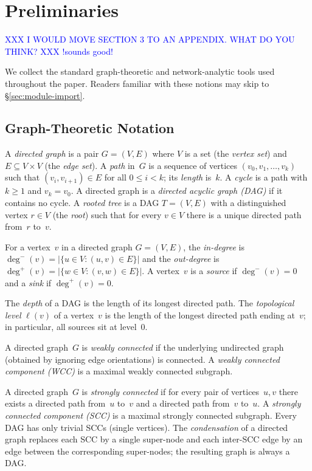 \section{Preliminaries}
\label{sec:preliminaries}

\textcolor{blue}{XXX I WOULD MOVE SECTION 3 TO AN APPENDIX. WHAT DO YOU THINK? XXX !sounds good!}


We collect the standard graph-theoretic and network-analytic tools used throughout the paper. Readers familiar with these notions may skip to \S\ref{sec:module-import}.

\subsection{Graph-Theoretic Notation}
\label{sec:prelim-graph}

A \emph{directed graph} is a pair $G = (V, E)$ where $V$ is a set (the \emph{vertex set}) and $E \subseteq V \times V$ (the \emph{edge set}). A \emph{path} in~$G$ is a sequence of vertices $(v_0, v_1, \ldots, v_k)$ such that $(v_i, v_{i+1}) \in E$ for all $0 \le i < k$; its \emph{length} is~$k$. A \emph{cycle} is a path with $k \ge 1$ and $v_k = v_0$. A directed graph is a \emph{directed acyclic graph (DAG)} if it contains no cycle. A \emph{rooted tree} is a DAG $T = (V, E)$ with a distinguished vertex $r \in V$ (the \emph{root}) such that for every $v \in V$ there is a unique directed path from~$r$ to~$v$.

For a vertex~$v$ in a directed graph $G = (V, E)$, the \emph{in-degree} is $\deg^{-}(v) = |\{u \in V : (u, v) \in E\}|$ and the \emph{out-degree} is $\deg^{+}(v) = |\{w \in V : (v, w) \in E\}|$. A vertex~$v$ is a \emph{source} if $\deg^{-}(v) = 0$ and a \emph{sink} if $\deg^{+}(v) = 0$.

The \emph{depth} of a DAG is the length of its longest directed path. The \emph{topological level} $\ell(v)$ of a vertex~$v$ is the length of the longest directed path ending at~$v$; in particular, all sources sit at level~$0$.

A directed graph~$G$ is \emph{weakly connected} if the underlying undirected graph (obtained by ignoring edge orientations) is connected. A \emph{weakly connected component (WCC)} is a maximal weakly connected subgraph.

A directed graph~$G$ is \emph{strongly connected} if for every pair of vertices~$u, v$ there exists a directed path from~$u$ to~$v$ and a directed path from~$v$ to~$u$. A \emph{strongly connected component (SCC)} is a maximal strongly connected subgraph. Every DAG has only trivial SCCs (single vertices). The \emph{condensation} of a directed graph replaces each SCC by a single super-node and each inter-SCC edge by an edge between the corresponding super-nodes; the resulting graph is always a DAG.

